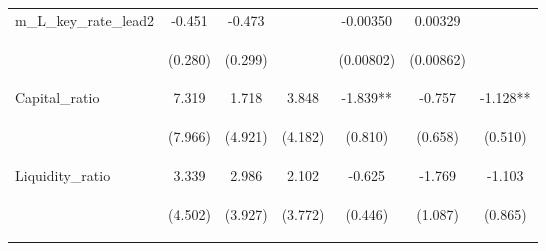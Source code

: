 \documentclass[]{article}
\begin{document}
\begin{center}
\begin{tabular}{lcccccc}
m\_L\_key\_rate\_lead2 & -0.451 & -0.473 &  & -0.00350 & 0.00329 &  \\
\vspace{4pt} & \begin{footnotesize}(0.280)\end{footnotesize} & \begin{footnotesize}(0.299)\end{footnotesize} & \begin{footnotesize}\end{footnotesize} & \begin{footnotesize}(0.00802)\end{footnotesize} & \begin{footnotesize}(0.00862)\end{footnotesize} & \begin{footnotesize}\end{footnotesize} \\
Capital\_ratio & 7.319 & 1.718 & 3.848 & -1.839** & -0.757 & -1.128** \\
\vspace{4pt} & \begin{footnotesize}(7.966)\end{footnotesize} & \begin{footnotesize}(4.921)\end{footnotesize} & \begin{footnotesize}(4.182)\end{footnotesize} & \begin{footnotesize}(0.810)\end{footnotesize} & \begin{footnotesize}(0.658)\end{footnotesize} & \begin{footnotesize}(0.510)\end{footnotesize} \\
Liquidity\_ratio & 3.339 & 2.986 & 2.102 & -0.625 & -1.769 & -1.103 \\
\vspace{4pt} & \begin{footnotesize}(4.502)\end{footnotesize} & \begin{footnotesize}(3.927)\end{footnotesize} & \begin{footnotesize}(3.772)\end{footnotesize} & \begin{footnotesize}(0.446)\end{footnotesize} & \begin{footnotesize}(1.087)\end{footnotesize} & \begin{footnotesize}(0.865)\end{footnotesize} \\

\end{tabular}
\end{center}
\end{document}
